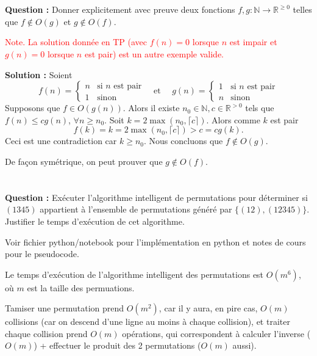 \documentclass[11pt]{article} %
\newenvironment{question}[1][\unskip]{%
	\par
	\noindent
	\textbf{Question #1:}
	\noindent}
{\medskip}
\newenvironment{solution}[1][\unskip]{%
	\par
	\noindent
	\textbf{Solution #1:}
	\noindent}
{\medskip}
\begin{document}
\section{}
\begin{question}
	Donner explicitement avec preuve deux fonctions $f,g: \mathbb{N} \rightarrow \mathbb{R}^{\geq 0}$ telles que $f \notin O(g)$ et $g\notin O(f)$.
\end{question}

\textcolor{red}{Note.  La solution donnée en TP (avec $f(n) = 0 $ lorsque $n$ est impair et $g(n)=0$ lorsque $n$ est pair) est un autre exemple valide.}
\begin{solution}
	Soient
	$$f(n)=\left\{
	\begin{array}{ll}
	n & \text{si } n \text{ est pair}\\
	1 & \text{sinon }
	\end{array} \right. \quad \text{et } \quad g(n)=\left\{
	\begin{array}{ll}
	1 & \text{si } n \text{ est pair}\\
	n & \text{sinon }
	\end{array} \right.$$
	Supposons que $f \in O(g(n))$. Alors il existe $n_0 \in \mathbb{N}, c \in \mathbb{R}^{>0}$ tels que $f(n) \leq cg(n)$, $\forall n\geq n_0.$ Soit $k=2\max(n_0,\lceil c \rceil)$. Alors comme $k$ est pair 
	$$f(k)=k=2\max(n_0,\lceil c \rceil)> c = cg(k).$$
	Ceci est une contradiction car $k \geq n_0$. Nous concluons que $f \notin O(g)$.
	
	De façon symétrique, on peut prouver que $g\notin O(f)$.
\end{solution}

\section{}
\begin{question}
	Exécuter l'algorithme intelligent de permutations pour déterminer si $(1345)$ appartient à l'ensemble de permutations généré par $\{(12),(12345)\}$. Justifier le temps d'exécution de cet algorithme.
\end{question}

Voir fichier python/notebook pour l'implémentation en python et notes de cours pour le pseudocode.

Le temps d'exécution de l'algorithme intelligent des permutations est $O(m^6)$, où $m$ est la taille des permuations.

Tamiser une permutation prend $O(m^2)$, car il y aura, en pire cas, $O(m)$ collisions (car on descend d'une ligne au moins à chaque collision), et traiter chaque collision prend $O(m)$ opérations, qui correspondent à calculer l'inverse ($O(m)$) + effectuer le produit des 2 permutations ($O(m)$ aussi).
\end{document}
